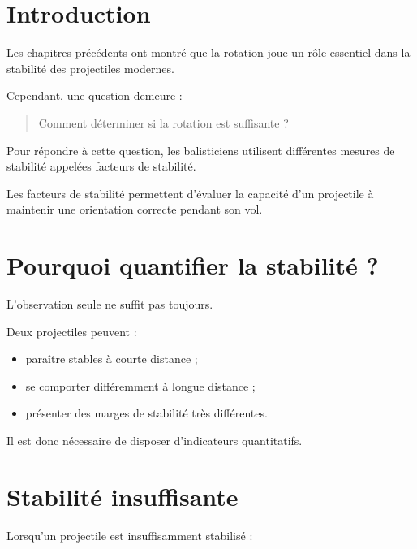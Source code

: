 
\section{Introduction}

Les chapitres précédents ont montré que la rotation joue un rôle essentiel
dans la stabilité des projectiles modernes.

Cependant, une question demeure :

\begin{quote}
Comment déterminer si la rotation est suffisante ?
\end{quote}

Pour répondre à cette question, les balisticiens utilisent différentes
mesures de stabilité appelées facteurs de stabilité.

\begin{aretenir}

Les facteurs de stabilité permettent d'évaluer la capacité d'un projectile à
maintenir une orientation correcte pendant son vol.

\end{aretenir}

\section{Pourquoi quantifier la stabilité ?}

L'observation seule ne suffit pas toujours.

Deux projectiles peuvent :

\begin{itemize}
    \item paraître stables à courte distance ;
    \item se comporter différemment à longue distance ;
    \item présenter des marges de stabilité très différentes.
\end{itemize}

Il est donc nécessaire de disposer d'indicateurs quantitatifs.

\section{Stabilité insuffisante}

Lorsqu'un projectile est insuffisamment stabilisé :

